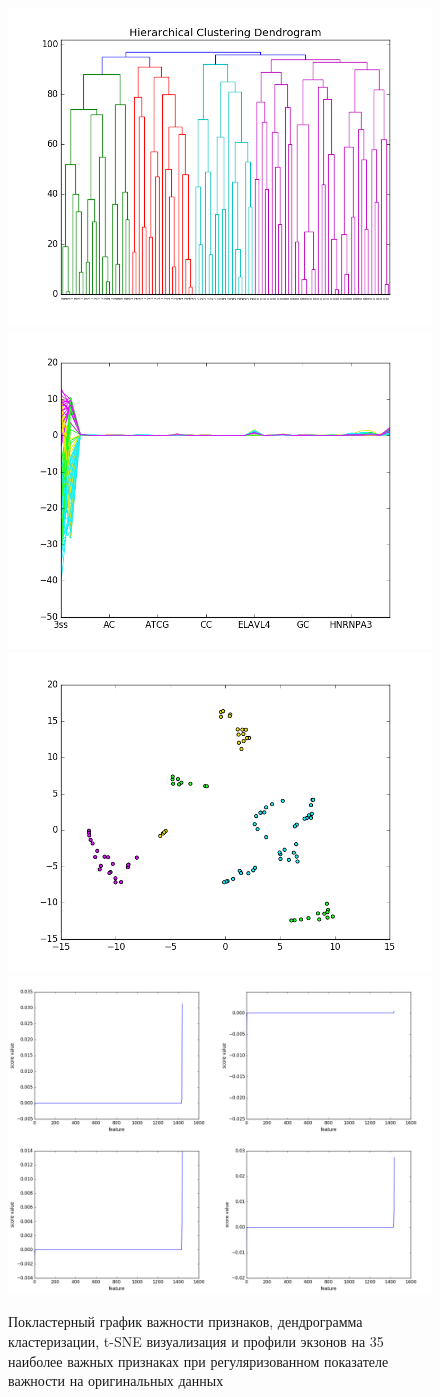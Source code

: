 \begin{figure}[H]
	\includegraphics[width=0.5\linewidth]{pics/dendrograms/ndfs_unnorm_cosine_1c.png} 
	\includegraphics[width=0.5\linewidth]{pics/profiles/ndfs_unnorm_cosine_1c.png}
	\includegraphics[width=0.5\linewidth]{pics/tsne/ndfs_unnorm_cosine_1c.png} \\
	\includegraphics[width=0.8\linewidth]{pics/graphs/ndfs_unnorm_cosine.png}
	\caption{Покластерный график важности признаков, дендрограмма кластеризации, t-SNE визуализация и профили экзонов на 35 наиболее важных признаках при регуляризованном показателе важности на оригинальных данных}
	\label{ndfs_unnorm_cosine}
\end{figure}

